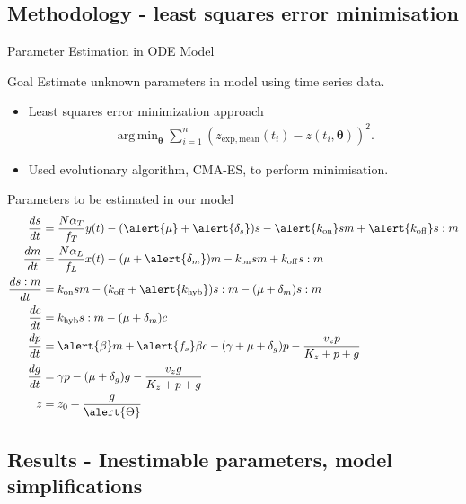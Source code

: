 \documentclass{beamer}
\DeclareMathOperator*{\argmin}{arg\,min}
\begin{document}
\subsection{Methodology - least squares error minimisation}

\begin{frame}{Parameter Estimation in ODE Model}
  \begin{block}{Goal}
 Estimate unknown parameters in model using time series data.
    \end{block}
    
      \begin{itemize}
    \item  Least squares error minimization approach
    \begin{align*}
\argmin_{\boldsymbol{\theta}} \sum_{i =1}^{n} (z_{\mathrm{exp, mean}}(t_{i}) - z(t_{i},\boldsymbol{\theta}))^2.
\end{align*}
\item Used evolutionary algorithm, CMA-ES, to perform minimisation.
    \end{itemize}
\end{frame}

\small
\begin{frame}{Parameters to be estimated in our model}
\begin{align*} 
\frac{ds}{dt} &= \frac{N\alpha_{T}}{f_{T}} y(t)-(\alert{\mu} + \alert{\delta_{s}})s -\alert{k_{\mathrm{on}}}sm +\alert{k_{\mathrm{off}}}s:m \\
\frac{dm}{dt} &=  \frac{N\alpha_{L}}{f_{L}}x(t)-(\mu + \alert{\delta_{m}})m -k_{\mathrm{on}}sm +k_{\mathrm{off}}s:m  \\
\frac{ds:m}{dt} & = k_{\mathrm{on}}sm  - (k_{\mathrm{off}}+ \alert{k_{\mathrm{hyb}}})s:m  -(\mu + \delta_{m} )s:m \\
\frac{dc}{dt} & = k_{\mathrm{hyb}}s:m  -(\mu + \delta_{m})c  \\
\frac{dp}{dt} & = \alert{\beta} m +\alert{f_{s}}\beta c -(\gamma + \mu + \delta_{g})p - \frac{v_{z}p}{K_{z}+p+g}   \\
\frac{dg}{dt} & = \gamma p - (\mu + \delta_{g})g - \frac{v_{z}g}{K_{z}+p+g} \\
z &= z_{0} +\frac{g}{\alert{\Theta}} 
\end{align*}
\end{frame}
\normalsize


\subsection{Results - Inestimable parameters, model simplifications}
\end{document}
